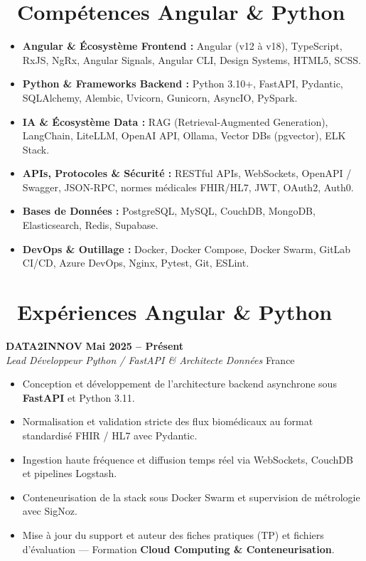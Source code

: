 \documentclass[10pt,a4paper]{article}
\begin{document}
\section{\faCogs\ Compétences Angular \& Python}
\begin{itemize}[leftmargin=1.4em, itemsep=0.25em, topsep=0.15em]
    \item \textbf{Angular \& Écosystème Frontend :} Angular (v12 à v18), TypeScript, RxJS, NgRx, Angular Signals, Angular CLI, Design Systems, HTML5, SCSS.
    \item \textbf{Python \& Frameworks Backend :} Python 3.10+, FastAPI, Pydantic, SQLAlchemy, Alembic, Uvicorn, Gunicorn, AsyncIO, PySpark.
    \item \textbf{IA \& Écosystème Data :} RAG (Retrieval-Augmented Generation), LangChain, LiteLLM, OpenAI API, Ollama, Vector DBs (pgvector), ELK Stack.
    \item \textbf{APIs, Protocoles \& Sécurité :} RESTful APIs, WebSockets, OpenAPI / Swagger, JSON-RPC, normes médicales FHIR/HL7, JWT, OAuth2, Auth0.
    \item \textbf{Bases de Données :} PostgreSQL, MySQL, CouchDB, MongoDB, Elasticsearch, Redis, Supabase.
    \item \textbf{DevOps \& Outillage :} Docker, Docker Compose, Docker Swarm, GitLab CI/CD, Azure DevOps, Nginx, Pytest, Git, ESLint.
\end{itemize}

\section{\faBriefcase\ Expériences Angular \& Python}

\textbf{\large DATA2INNOV} \hfill {\bfseries\small\color{slateGray} Mai 2025 -- Présent} \\
\emph{\color{primary}Lead Développeur Python / FastAPI \& Architecte Données} \hfill {\small France}
\begin{itemize}[leftmargin=1.4em, itemsep=0.18em, topsep=0.15em]
    \item Conception et développement de l'architecture backend asynchrone sous \textbf{FastAPI} et Python 3.11.
    \item Normalisation et validation stricte des flux biomédicaux au format standardisé FHIR / HL7 avec Pydantic.
    \item Ingestion haute fréquence et diffusion temps réel via WebSockets, CouchDB et pipelines Logstash.
    \item Conteneurisation de la stack sous Docker Swarm et supervision de métrologie avec SigNoz.
    \item Mise à jour du support et auteur des fiches pratiques (TP) et fichiers d'évaluation --- Formation \textbf{Cloud Computing \& Conteneurisation}.
\end{itemize}
\end{document}
